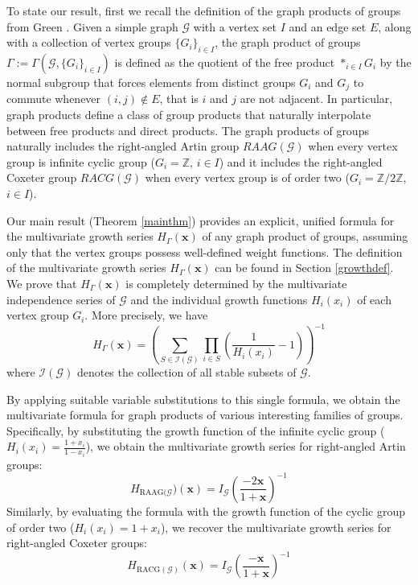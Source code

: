 \documentclass[11pt,reqno]{amsart}
\numberwithin{equation}{section} %
\theoremstyle{definition}
\theoremstyle{remark}
\numberwithin{equation}{section}
\begin{document}
To state our result, first we recall the definition of the graph products of groups from Green \cite{Green}. Given a simple graph $\mathcal{G}$ with a vertex set $I$ and an edge set $E$, along with a collection of vertex groups $\{G_i\}_{i \in I}$, the graph product of groups $\Gamma := \Gamma(\mathcal{G}, \{G_i\}_{i\in I})$ is defined as the quotient of the free product   $\ast_{i \in I} G_i$ by the normal subgroup that forces elements from distinct groups $G_i$ and $G_j$ to commute whenever $(i,j) \notin E$, that is $i$ and $j$ are not adjacent. In particular, graph products define a class of group products that naturally interpolate between free products and direct products. The graph products of groups naturally includes the right-angled Artin group $RAAG({\mathcal{G}})$ when every vertex group is infinite cyclic group ($G_i=\mathbb{Z}$, $i\in I$) and it includes the right-angled Coxeter group $RACG({\mathcal{G}})$ when every vertex group is of order two ($G_i=\mathbb{Z}/2\mathbb{Z}$, $i\in I$). 

Our main result (Theorem \ref{mainthm}) provides an explicit, unified formula for the multivariate growth series $H_{\Gamma}(\mathbf{x})$ of any graph product of groups, assuming only that the vertex groups possess well-defined weight functions. The definition of the multivariate growth series $H_{\Gamma}(\mathbf{x})$ can be found in Section \ref{growthdef}. We prove that $H_{\Gamma}(\mathbf{x})$ is completely determined by the multivariate independence series of $\mathcal{G}$ and the individual growth functions $H_i(x_i)$ of each vertex group ${G}_i$. More precisely, we have 
$$H_{\Gamma}(\mathbf{x}) = \left( \sum_{S \in \mathcal{I}(\mathcal{G})} \prod_{i \in S} \left( \frac{1}{H_i(x_i)} - 1 \right) \right)^{-1}
$$
where $\mathcal{I(G)}$ denotes the collection of all stable subsets of $\mathcal{G}$.

By applying suitable variable substitutions to this single formula, we obtain the multivariate formula for graph products of various interesting families of groups. Specifically, by substituting the growth function of the infinite cyclic group ($H_i(x_i) = \frac{1+x_i}{1-x_i}$), we obtain the multivariate growth series for right-angled Artin groups:
\[
H_{\text{RAAG}({\mathcal{G}}})(\mathbf{x}) = I_{\mathcal{G}}\left(\frac{-2\mathbf{x}}{1+\mathbf{x}}\right)^{-1}
\]
Similarly, by evaluating the formula with the growth function of the cyclic group of order two ($H_i(x_i) = 1+x_i$), we  recover the multivariate growth series for right-angled Coxeter groups:
\[
H_{\text{RACG}({\mathcal{G}})}(\mathbf{x}) = I_{\mathcal{G}}\left(\frac{-\mathbf{x}}{1+\mathbf{x}}\right)^{-1}
\]
\end{document}
